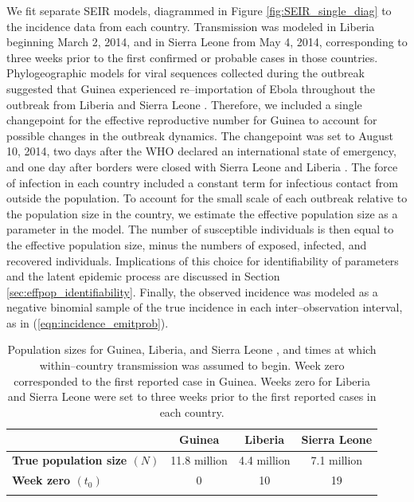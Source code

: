 We fit separate SEIR models, diagrammed in Figure \ref{fig:SEIR_single_diag} to the incidence data from each country. Transmission was modeled in Liberia beginning March 2, 2014, and in Sierra Leone from May 4, 2014, corresponding to three weeks prior to the first confirmed or probable cases in those countries. Phylogeographic models for viral sequences collected during the outbreak suggested that Guinea experienced re--importation of Ebola throughout the outbreak from Liberia and Sierra Leone \cite{dudas2017virus}. Therefore, we included a single changepoint for the effective reproductive number for Guinea to account for possible changes in the outbreak dynamics. The changepoint was set to August 10, 2014, two days after the WHO declared an international state of emergency, and one day after borders were closed with Sierra Leone and Liberia \cite{coltart2017ebola}. The force of infection in each country included a constant term for infectious contact from outside the population. To account for the small scale of each outbreak relative to the population size in the country, we estimate the effective population size as a parameter in the model. The number of susceptible individuals is then equal to the effective population size, minus the numbers of exposed, infected, and recovered individuals. Implications of this choice for identifiability of parameters and the latent epidemic process are discussed in Section \ref{sec:effpop_identifiability}. Finally, the observed incidence was modeled as a negative binomial sample of the true incidence in each inter--observation interval, as in (\ref{eqn:incidence_emitprob}).

\begin{table}[htbp]
	\caption[Population sizes for Guinea, Liberia, and Sierra Leone, along with times at which transmission was assumed to begin.]{Population sizes for Guinea, Liberia, and Sierra Leone \cite{un2017popdat}, and times at which within--country transmission was assumed to begin. Week zero corresponded to the first reported case in Guinea. Weeks zero for Liberia and Sierra Leone were set to three weeks prior to the first reported cases in each country.}
	\label{tab:ebola_pops_t0}
	\footnotesize
	\centering
	\begin{tabular}{lccc}	
		\hline	
		& \textbf{Guinea} & \textbf{Liberia} & \textbf{Sierra Leone} \\\hline
		\textbf{True population size $ (N)$} & 11.8 million & 4.4 million & 7.1 million \\ 
		\textbf{Week zero $ (t_0) $} & 0 & 10 & 19 \\
		\hline
		&&&
	\end{tabular} 
\end{table}

